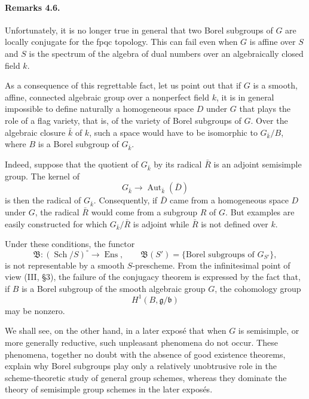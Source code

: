 
\paragraph{\textbf{Remarks 4.6.}}
Unfortunately, it is no longer true in general that two Borel
subgroups of \(G\) are locally conjugate for the fpqc topology.
This can fail even when \(G\) is affine over \(S\) and \(S\) is
the spectrum of the algebra of dual numbers over an algebraically
closed field \(k\).

As a consequence of this regrettable fact, let us point out that
if \(G\) is a smooth, affine, connected algebraic group over a
nonperfect field \(k\), it is in general impossible to define
naturally a homogeneous space \(D\) under \(G\) that plays the
role of a flag variety, that is, of the variety of Borel subgroups
of \(G\). Over the algebraic closure \(\bar k\) of \(k\), such a
space would have to be isomorphic to \(G_{\bar k}/B\), where \(B\)
is a Borel subgroup of \(G_{\bar k}\).

Indeed, suppose that the quotient of \(G_{\bar k}\) by its radical
\(\bar R\) is an adjoint semisimple group. The kernel of
\[
  G_{\bar k}\longrightarrow
  \operatorname{Aut}_{\bar k}(\bar D)
\]
is then the radical of \(G_{\bar k}\). Consequently, if \(\bar D\)
came from a homogeneous space \(D\) under \(G\), the radical
\(\bar R\) would come from a subgroup \(R\) of \(G\). But examples
are easily constructed for which \(G_{\bar k}/\bar R\) is adjoint
while \(\bar R\) is not defined over \(k\).

Under these conditions, the functor
\[
  \mathfrak B\colon(\operatorname{Sch}/S)^\circ
    \longrightarrow \operatorname{Ens},
  \qquad
  \mathfrak B(S')=
  \{\text{Borel subgroups of }G_{S'}\},
\]
is not representable by a smooth \(S\)-prescheme. From the
infinitesimal point of view \textup{(III, \S3)}, the failure of the
conjugacy theorem is expressed by the fact that, if \(B\) is a
Borel subgroup of the smooth algebraic group \(G\), the cohomology
group
\[
  H^1(B,\mathfrak g/\mathfrak b)
\]
may be nonzero.

We shall see, on the other hand, in a later exposé that when \(G\)
is semisimple, or more generally reductive, such unpleasant
phenomena do not occur. These phenomena, together no doubt with
the absence of good existence theorems, explain why Borel
subgroups play only a relatively unobtrusive role in the
scheme-theoretic study of general group schemes, whereas they
dominate the theory of semisimple group schemes in the later
exposés.

